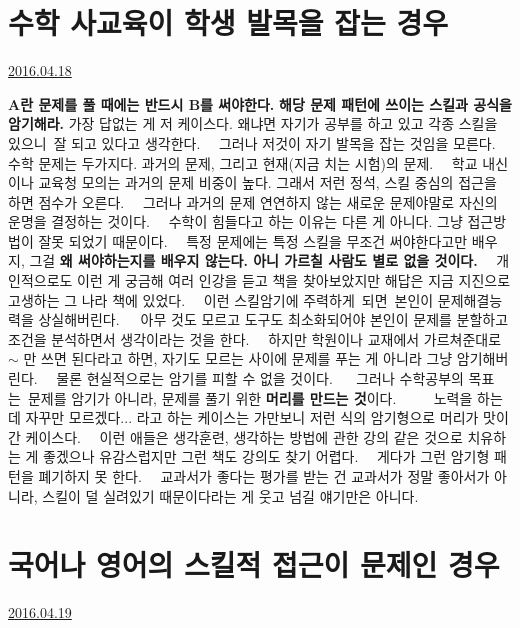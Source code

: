 \section{수학 사교육이 학생 발목을 잡는 경우}
\href{https://www.kockoc.com/Apoc/734042}{2016.04.18}

\vspace{5mm}

\textbf{A란 문제를 풀 때에는 반드시 B를 써야한다.}
\textbf{해당 문제 패턴에 쓰이는 스킬과 공식을 암기해라.}
가장 답없는 게 저 케이스다. 왜냐면 자기가 공부를 하고 있고 각종 스킬을 있으니 잘 되고 있다고 생각한다.   그러나 저것이 자기 발목을 잡는 것임을 모른다.   수학 문제는 두가지다. 과거의 문제, 그리고 현재(지금 치는 시험)의 문제.   학교 내신이나 교육청 모의는 과거의 문제 비중이 높다. 그래서 저런 정석, 스킬 중심의 접근을 하면 점수가 오른다.   그러나 과거의 문제 연연하지 않는 새로운 문제야말로 자신의 운명을 결정하는 것이다.   수학이 힘들다고 하는 이유는 다른 게 아니다. 그냥 접근방법이 잘못 되었기 때문이다.   특정 문제에는 특정 스킬을 무조건 써야한다고만 배우지, 그걸 \textbf{왜 써야하는지를 배우지 않는다. 아니 가르칠 사람도 별로 없을 것이다.}   개인적으로도 이런 게 궁금해 여러 인강을 듣고 책을 찾아보았지만 해답은 지금 지진으로 고생하는 그 나라 책에 있었다.   이런 스킬암기에 주력하게 되면 본인이 문제해결능력을 상실해버린다.   아무 것도 모르고 도구도 최소화되어야 본인이 문제를 분할하고 조건을 분석하면서 생각이라는 것을 한다.   하지만 학원이나 교재에서 가르쳐준대로 $\sim$ 만 쓰면 된다라고 하면, 자기도 모르는 사이에 문제를 푸는 게 아니라 그냥 암기해버린다.   물론 현실적으로는 암기를 피할 수 없을 것이다.    그러나 수학공부의 목표는 문제를 암기가 아니라, 문제를 풀기 위한 \textbf{머리를 만드는 것}이다.      노력을 하는데 자꾸만 모르겠다... 라고 하는 케이스는 가만보니 저런 식의 암기형으로 머리가 맛이 간 케이스다.   이런 애들은 생각훈련, 생각하는 방법에 관한 강의 같은 것으로 치유하는 게 좋겠으나 유감스럽지만 그런 책도 강의도 찾기 어렵다.   게다가 그런 암기형 패턴을 폐기하지 못 한다.   교과서가 좋다는 평가를 받는 건 교과서가 정말 좋아서가 아니라, 스킬이 덜 실려있기 때문이다라는 게 웃고 넘길 얘기만은 아니다.





\section{국어나 영어의 스킬적 접근이 문제인 경우}
\href{https://www.kockoc.com/Apoc/735647}{2016.04.19}

\vspace{5mm}

